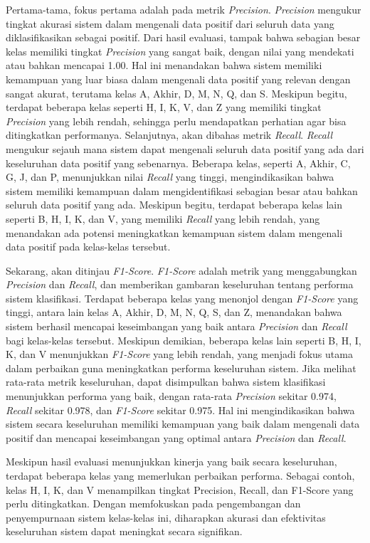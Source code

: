 Pertama-tama, fokus pertama adalah pada metrik \textit{Precision}. \textit{Precision} mengukur tingkat akurasi sistem dalam mengenali data positif dari seluruh data yang diklasifikasikan sebagai positif. Dari hasil evaluasi, tampak bahwa sebagian besar kelas memiliki tingkat \textit{Precision} yang sangat baik, dengan nilai yang mendekati atau bahkan mencapai 1.00. Hal ini menandakan bahwa sistem memiliki kemampuan yang luar biasa dalam mengenali data positif yang relevan dengan sangat akurat, terutama kelas A, Akhir, D, M, N, Q, dan S. Meskipun begitu, terdapat beberapa kelas seperti H, I, K, V, dan Z yang memiliki tingkat \textit{Precision} yang lebih rendah, sehingga perlu mendapatkan perhatian agar bisa ditingkatkan performanya. Selanjutnya, akan dibahas metrik \textit{Recall}. \textit{Recall} mengukur sejauh mana sistem dapat mengenali seluruh data positif yang ada dari keseluruhan data positif yang sebenarnya. Beberapa kelas, seperti A, Akhir, C, G, J, dan P, menunjukkan nilai \textit{Recall} yang tinggi, mengindikasikan bahwa sistem memiliki kemampuan dalam mengidentifikasi sebagian besar atau bahkan seluruh data positif yang ada. Meskipun begitu, terdapat beberapa kelas lain seperti B, H, I, K, dan V, yang memiliki \textit{Recall} yang lebih rendah, yang menandakan ada potensi  meningkatkan kemampuan sistem dalam mengenali data positif pada kelas-kelas tersebut.

Sekarang, akan ditinjau \textit{F1-Score}. \textit{F1-Score} adalah metrik yang menggabungkan \textit{Precision} dan \textit{Recall}, dan memberikan gambaran keseluruhan tentang performa sistem klasifikasi. Terdapat beberapa kelas yang menonjol dengan \textit{F1-Score} yang tinggi, antara lain kelas A, Akhir, D, M, N, Q, S, dan Z, menandakan bahwa sistem berhasil mencapai keseimbangan yang baik antara \textit{Precision} dan \textit{Recall} bagi kelas-kelas tersebut. Meskipun demikian, beberapa kelas lain seperti B, H, I, K, dan V menunjukkan \textit{F1-Score} yang lebih rendah, yang menjadi fokus utama dalam perbaikan guna meningkatkan performa keseluruhan sistem. Jika melihat rata-rata metrik keseluruhan, dapat disimpulkan bahwa sistem klasifikasi menunjukkan performa yang baik, dengan rata-rata \textit{Precision} sekitar 0.974, \textit{Recall} sekitar 0.978, dan \textit{F1-Score} sekitar 0.975. Hal ini mengindikasikan bahwa sistem secara keseluruhan memiliki kemampuan yang baik dalam mengenali data positif dan mencapai keseimbangan yang optimal antara \textit{Precision} dan \textit{Recall}.

Meskipun hasil evaluasi menunjukkan kinerja yang baik secara keseluruhan, terdapat beberapa kelas yang memerlukan perbaikan performa. Sebagai contoh, kelas H, I, K, dan V menampilkan tingkat Precision, Recall, dan F1-Score yang perlu ditingkatkan. Dengan memfokuskan pada pengembangan dan penyempurnaan sistem kelas-kelas ini, diharapkan akurasi dan efektivitas keseluruhan sistem dapat meningkat secara signifikan.

